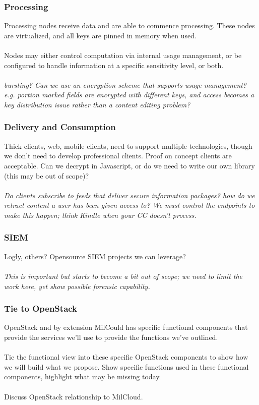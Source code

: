 \documentclass[t,handout]{beamer}
\begin{document}
\begin{frame}
\frametitle{Processing}
Processing nodes receive data and are able to commence processing.  These nodes are virtualized, and all keys are pinned in memory when used.  \\~\\

Nodes may either control computation via internal usage management, or be configured to handle information at a specific sensitivity level, or both. \\~\\

{\sl bursting? Can we use an encryption scheme that supports usage management? e.g. portion marked fields are encrypted with different keys, and access becomes a key distribution issue rather than a content editing problem?}
\end{frame}

\begin{frame}
\frametitle{Delivery and Consumption}
Thick clients, web, mobile clients, need to support multiple technologies, though we don't need to develop professional clients.  Proof on concept clients are acceptable.  Can we decrypt in Javascript, or do we need to write our own library (this may be out of scope)? \\~\\

{\sl Do clients subscribe to feeds that deliver secure information packages? how do we retract content a user has been given access to? We must control the endpoints to make this happen; think Kindle when your CC doesn't process. }
\end{frame}

\begin{frame}
\frametitle{SIEM}
Logly, others? Opensource SIEM projects we can leverage? \\~\\

{\sl This is important but starts to become a bit out of scope; we need to limit the work here, yet show possible forensic capability.}

\end{frame}

\begin{frame}
\frametitle{Tie to OpenStack}
OpenStack and by extension MilCould has specific functional components that provide the services we'll use to provide the functions we've outlined. \\~\\

Tie the functional view into these specific OpenStack components to show how we will build what we propose. Show specific functions used in these functional components, highlight what may be missing today.\\~\\

Discuss OpenStack relationship to MilCloud.
\end{frame}
\end{document}
